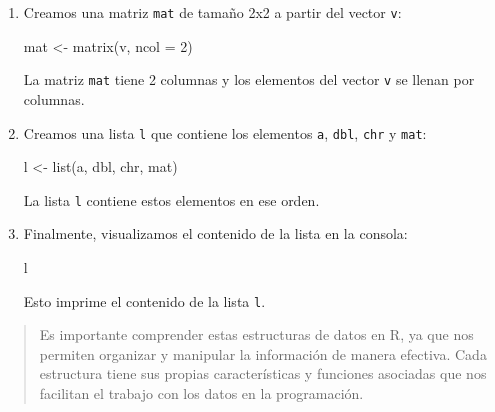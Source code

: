 \documentclass[
  jou,
  floatsintext,
  longtable,
  a4paper,
  nolmodern,
  notxfonts,
  notimes,
  12pt,
  colorlinks=true,linkcolor=blue,citecolor=blue,urlcolor=blue]{apa7}
\newenvironment{Shaded}{\begin{snugshade}}{\end{snugshade}}
\newcommand{\AttributeTok}[1]{\textcolor[rgb]{0.40,0.45,0.13}{#1}}
\newcommand{\DecValTok}[1]{\textcolor[rgb]{0.68,0.00,0.00}{#1}}
\newcommand{\FloatTok}[1]{\textcolor[rgb]{0.68,0.00,0.00}{#1}}
\newcommand{\FunctionTok}[1]{\textcolor[rgb]{0.28,0.35,0.67}{#1}}
\newcommand{\NormalTok}[1]{\textcolor[rgb]{0.00,0.23,0.31}{#1}}
\newcommand{\OtherTok}[1]{\textcolor[rgb]{0.00,0.23,0.31}{#1}}
\begin{document}
\begin{enumerate}
\begin{Shaded}
\begin{Highlighting}[]
\NormalTok{v }\OtherTok{\textless{}{-}} \FunctionTok{c}\NormalTok{(}\FloatTok{1.1}\NormalTok{, }\FloatTok{1.2}\NormalTok{, }\FloatTok{1.3}\NormalTok{, }\FloatTok{1.4}\NormalTok{)}
\end{Highlighting}
\end{Shaded}
\item
  Creamos una matriz \texttt{mat} de tamaño 2x2 a partir del vector
  \texttt{v}:

\begin{Shaded}
\begin{Highlighting}[]
\NormalTok{mat }\OtherTok{\textless{}{-}} \FunctionTok{matrix}\NormalTok{(v, }\AttributeTok{ncol =} \DecValTok{2}\NormalTok{)}
\end{Highlighting}
\end{Shaded}

  La matriz \texttt{mat} tiene 2 columnas y los elementos del vector
  \texttt{v} se llenan por columnas.
\item
  Creamos una lista \texttt{l} que contiene los elementos \texttt{a},
  \texttt{dbl}, \texttt{chr} y \texttt{mat}:

\begin{Shaded}
\begin{Highlighting}[]
\NormalTok{l }\OtherTok{\textless{}{-}} \FunctionTok{list}\NormalTok{(a, dbl, chr, mat)}
\end{Highlighting}
\end{Shaded}

  La lista \texttt{l} contiene estos elementos en ese orden.
\item
  Finalmente, visualizamos el contenido de la lista en la consola:

\begin{Shaded}
\begin{Highlighting}[]
\NormalTok{l}
\end{Highlighting}
\end{Shaded}

  Esto imprime el contenido de la lista \texttt{l}.
\end{enumerate}

\begin{quote}
Es importante comprender estas estructuras de datos en R, ya que nos
permiten organizar y manipular la información de manera efectiva. Cada
estructura tiene sus propias características y funciones asociadas que
nos facilitan el trabajo con los datos en la programación.
\end{quote}
\end{document}
